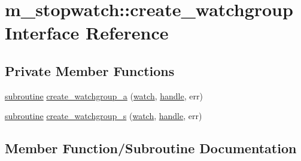 \hypertarget{interfacem__stopwatch_1_1create__watchgroup}{}\section{m\+\_\+stopwatch\+:\+:create\+\_\+watchgroup Interface Reference}
\label{interfacem__stopwatch_1_1create__watchgroup}
\subsection*{Private Member Functions}
\begin{DoxyCompactItemize}
\item 
\hyperlink{M__stopwatch_83_8txt_acfbcff50169d691ff02d4a123ed70482}{subroutine} \hyperlink{interfacem__stopwatch_1_1create__watchgroup_a054f7b1449ae963add9b77b13517faca}{create\+\_\+watchgroup\+\_\+a} (\hyperlink{read__watch_83_8txt_ad2129669fa47b8899641309620add095}{watch}, \hyperlink{leave__watchgroup_83_8txt_ad6c5ebd26f707ef8da754021612a7c8d}{handle}, err)
\item 
\hyperlink{M__stopwatch_83_8txt_acfbcff50169d691ff02d4a123ed70482}{subroutine} \hyperlink{interfacem__stopwatch_1_1create__watchgroup_aab128b0c24f995d5330559bf3faf6848}{create\+\_\+watchgroup\+\_\+s} (\hyperlink{read__watch_83_8txt_ad2129669fa47b8899641309620add095}{watch}, \hyperlink{leave__watchgroup_83_8txt_ad6c5ebd26f707ef8da754021612a7c8d}{handle}, err)
\end{DoxyCompactItemize}


\subsection{Member Function/\+Subroutine Documentation}
\mbox{\label{interfacem__stopwatch_1_1create__watchgroup_a054f7b1449ae963add9b77b13517faca}} 
